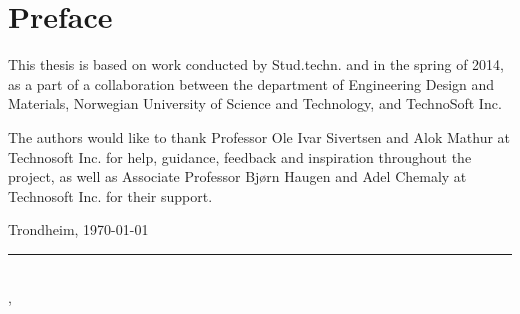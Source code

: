 \section*{Preface}

This thesis is based on work conducted by Stud.techn. \myauthorA and \myauthorB in the spring of 2014, as a part of a collaboration between the department of Engineering Design and Materials, Norwegian University of Science and Technology, and TechnoSoft Inc.

The authors would like to thank Professor Ole Ivar Sivertsen and Alok Mathur at Technosoft Inc. for help, guidance, feedback and inspiration throughout the project, as well as Associate Professor Bjørn Haugen and Adel Chemaly at Technosoft Inc. for their support.



Trondheim, \today


\rule{10cm}{0.5pt}\\
\indent \myauthorA, \myauthorB \\
